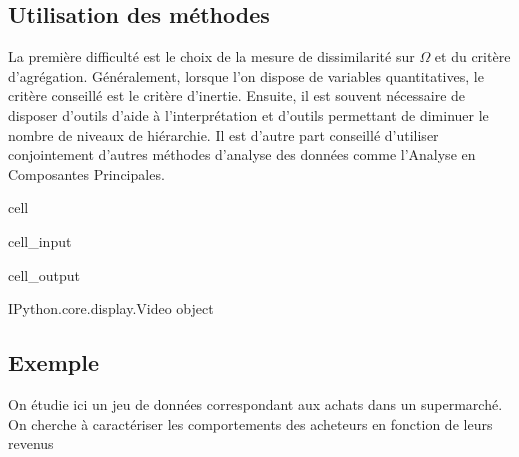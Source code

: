 \documentclass[letterpaper,10pt,french]{sphinxmanual}
\begin{document}
\subsection{Utilisation des méthodes}
\label{\detokenize{clustering:utilisation-des-methodes}}
\sphinxAtStartPar
La première difficulté est le choix de la mesure de dissimilarité sur  \(\Omega\) et du critère d’agrégation. Généralement, lorsque l’on dispose de variables quantitatives, le critère conseillé est le critère d’inertie. Ensuite, il est souvent nécessaire de disposer d’outils d’aide à l’interprétation et d’outils permettant de diminuer le nombre de niveaux de hiérarchie. Il est d’autre part conseillé d’utiliser conjointement d’autres méthodes d’analyse des données comme l’Analyse en Composantes Principales.

\begin{sphinxuseclass}{cell}
\begin{sphinxuseclass}{cell_input}
\begin{sphinxVerbatim}[commandchars=\\\{\}]
   
 
\end{sphinxVerbatim}

\end{sphinxuseclass}
\begin{sphinxuseclass}{cell_output}
\begin{sphinxVerbatim}[commandchars=\\\{\}]
\PYGZlt{}IPython.core.display.Video object\PYGZgt{}
\end{sphinxVerbatim}

\end{sphinxuseclass}
\end{sphinxuseclass}

\subsection{Exemple}
\label{\detokenize{clustering:exemple}}
\sphinxAtStartPar
On étudie ici un jeu de données correspondant aux achats dans un supermarché. On cherche à caractériser les comportements des acheteurs en fonction de leurs revenus
\end{document}
